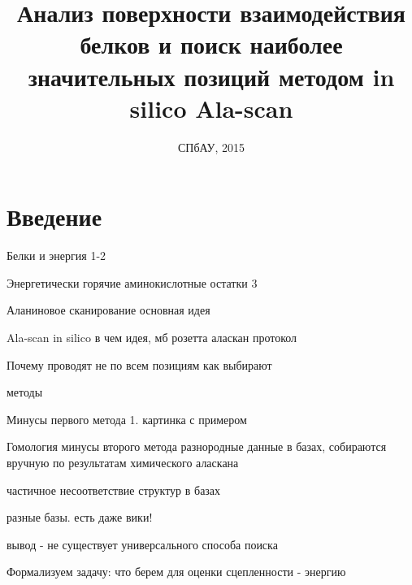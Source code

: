 \documentclass[12pt, xcolor={dvipsnames}]{beamer}
\title[] %
{Анализ поверхности взаимодействия белков и поиск наиболее значительных позиций методом in silico Ala-scan}
\author[] %
{
  \texorpdfstring{
	\begin{columns}
	\column{.55\linewidth}
		Магистрант:\\
		Научный руководитель:
	\column{.45\linewidth}
		Татьяна Малыгина, СПбАУ\\
		Павел Яковлев, BIOCAD
	\end{columns}
   }
   {\& }
}
\date[DIPLOMA 2015] %
{СПбАУ, 2015}
\begin{document}
\begin{frame}
  \titlepage
\end{frame}
\section{Введение}
\begin{frame}{Белки и энергия}
1-2
\end{frame}

\begin{frame}{Энергетически горячие аминокислотные остатки}
3
\end{frame}
\begin{frame}{Аланиновое сканирование}
основная идея
\end{frame}
\begin{frame}{Ala-scan in silico}
в чем идея, мб розетта аласкан протокол
\end{frame}
\begin{frame}{Почему проводят не по всем позициям}
как выбирают

методы
\end{frame}

\begin{frame}{Минусы первого метода}
1. картинка с примером
\end{frame}
\begin{frame}{Гомология}
минусы второго метода
разнородные данные в базах, собираются вручную по результатам химического аласкана

частичное несоответствие структур в базах

разные базы. есть даже вики!
\end{frame}
\begin{frame}
вывод - не существует универсального способа поиска 

Формализуем задачу:
что берем для оценки сцепленности - энергию
\end{frame}
\end{document}
